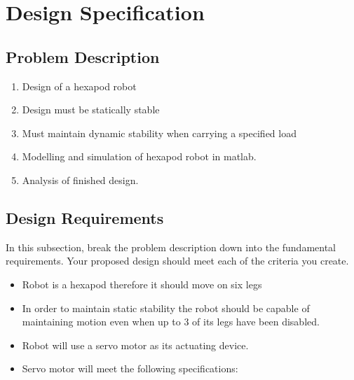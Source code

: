 \section{Design Specification}




\subsection{Problem Description}

\begin{enumerate}
	\item Design of a hexapod robot
	
	\item Design must be statically stable
	
	\item Must maintain dynamic stability when carrying a specified load
	
	\item Modelling and simulation of hexapod robot in matlab.
	
	\item Analysis of finished design.
	
\end{enumerate}





\subsection{Design Requirements}
In this subsection, break the problem description down into the fundamental requirements. Your proposed design should meet each of the criteria you create.

\begin{itemize}
	\item Robot is a hexapod therefore it should move on six legs
	\item In order to maintain static stability the robot should be capable of maintaining motion even when up to 3 of its legs have been disabled.
	\item Robot will use a servo motor as its actuating device.
	\item Servo motor will meet the following specifications:
	\end{itemize}

